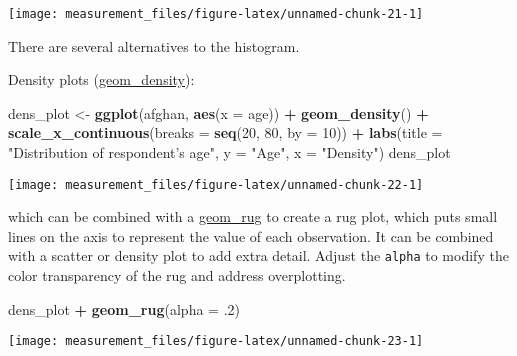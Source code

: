 \documentclass[]{book}
\newenvironment{Shaded}{\begin{snugshade}}{\end{snugshade}}
\newcommand{\KeywordTok}[1]{\textcolor[rgb]{0.13,0.29,0.53}{\textbf{#1}}}
\newcommand{\DataTypeTok}[1]{\textcolor[rgb]{0.13,0.29,0.53}{#1}}
\newcommand{\DecValTok}[1]{\textcolor[rgb]{0.00,0.00,0.81}{#1}}
\newcommand{\StringTok}[1]{\textcolor[rgb]{0.31,0.60,0.02}{#1}}
\newcommand{\OperatorTok}[1]{\textcolor[rgb]{0.81,0.36,0.00}{\textbf{#1}}}
\newcommand{\NormalTok}[1]{#1}
\theoremstyle{definition}
\theoremstyle{definition}
\theoremstyle{definition}
\theoremstyle{remark}
\begin{document}
\begin{center}\texttt{[image: measurement\_files/figure-latex/unnamed-chunk-21-1]} \end{center}

There are several alternatives to the histogram.

Density plots
(\href{https://www.rdocumentation.org/packages/ggplot2/topics/geom_density}{geom\_density}):

\begin{Shaded}
\begin{Highlighting}[]
\NormalTok{dens_plot <-}\StringTok{ }\KeywordTok{ggplot}\NormalTok{(afghan, }\KeywordTok{aes}\NormalTok{(}\DataTypeTok{x =}\NormalTok{ age)) }\OperatorTok{+}
\StringTok{  }\KeywordTok{geom_density}\NormalTok{() }\OperatorTok{+}
\StringTok{  }\KeywordTok{scale_x_continuous}\NormalTok{(}\DataTypeTok{breaks =} \KeywordTok{seq}\NormalTok{(}\DecValTok{20}\NormalTok{, }\DecValTok{80}\NormalTok{, }\DataTypeTok{by =} \DecValTok{10}\NormalTok{)) }\OperatorTok{+}
\StringTok{  }\KeywordTok{labs}\NormalTok{(}\DataTypeTok{title =} \StringTok{"Distribution of respondent's age"}\NormalTok{,}
       \DataTypeTok{y =} \StringTok{"Age"}\NormalTok{, }\DataTypeTok{x =} \StringTok{"Density"}\NormalTok{)}
\NormalTok{dens_plot}
\end{Highlighting}
\end{Shaded}

\begin{center}\texttt{[image: measurement\_files/figure-latex/unnamed-chunk-22-1]} \end{center}

which can be combined with a
\href{https://www.rdocumentation.org/packages/ggplot2/topics/geom_rug}{geom\_rug}
to create a rug plot, which puts small lines on the axis to represent
the value of each observation. It can be combined with a scatter or
density plot to add extra detail. Adjust the \texttt{alpha} to modify
the color transparency of the rug and address overplotting.

\begin{Shaded}
\begin{Highlighting}[]
\NormalTok{dens_plot }\OperatorTok{+}\StringTok{ }\KeywordTok{geom_rug}\NormalTok{(}\DataTypeTok{alpha =}\NormalTok{ .}\DecValTok{2}\NormalTok{)}
\end{Highlighting}
\end{Shaded}

\begin{center}\texttt{[image: measurement\_files/figure-latex/unnamed-chunk-23-1]} \end{center}
\end{document}
